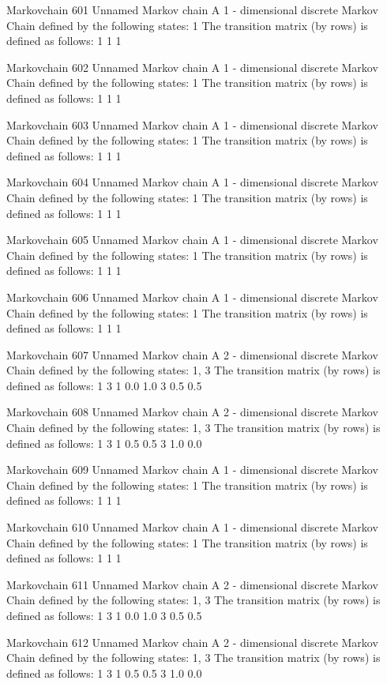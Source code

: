 \documentclass[
  nojss]{jss}
\begin{document}
\begin{CodeChunk}
\begin{CodeOutput}
Markovchain  601 
Unnamed Markov chain 
 A  1 - dimensional discrete Markov Chain defined by the following states: 
 1 
 The transition matrix  (by rows)  is defined as follows: 
  1
1 1

Markovchain  602 
Unnamed Markov chain 
 A  1 - dimensional discrete Markov Chain defined by the following states: 
 1 
 The transition matrix  (by rows)  is defined as follows: 
  1
1 1

Markovchain  603 
Unnamed Markov chain 
 A  1 - dimensional discrete Markov Chain defined by the following states: 
 1 
 The transition matrix  (by rows)  is defined as follows: 
  1
1 1

Markovchain  604 
Unnamed Markov chain 
 A  1 - dimensional discrete Markov Chain defined by the following states: 
 1 
 The transition matrix  (by rows)  is defined as follows: 
  1
1 1

Markovchain  605 
Unnamed Markov chain 
 A  1 - dimensional discrete Markov Chain defined by the following states: 
 1 
 The transition matrix  (by rows)  is defined as follows: 
  1
1 1

Markovchain  606 
Unnamed Markov chain 
 A  1 - dimensional discrete Markov Chain defined by the following states: 
 1 
 The transition matrix  (by rows)  is defined as follows: 
  1
1 1

Markovchain  607 
Unnamed Markov chain 
 A  2 - dimensional discrete Markov Chain defined by the following states: 
 1, 3 
 The transition matrix  (by rows)  is defined as follows: 
    1   3
1 0.0 1.0
3 0.5 0.5

Markovchain  608 
Unnamed Markov chain 
 A  2 - dimensional discrete Markov Chain defined by the following states: 
 1, 3 
 The transition matrix  (by rows)  is defined as follows: 
    1   3
1 0.5 0.5
3 1.0 0.0

Markovchain  609 
Unnamed Markov chain 
 A  1 - dimensional discrete Markov Chain defined by the following states: 
 1 
 The transition matrix  (by rows)  is defined as follows: 
  1
1 1

Markovchain  610 
Unnamed Markov chain 
 A  1 - dimensional discrete Markov Chain defined by the following states: 
 1 
 The transition matrix  (by rows)  is defined as follows: 
  1
1 1

Markovchain  611 
Unnamed Markov chain 
 A  2 - dimensional discrete Markov Chain defined by the following states: 
 1, 3 
 The transition matrix  (by rows)  is defined as follows: 
    1   3
1 0.0 1.0
3 0.5 0.5

Markovchain  612 
Unnamed Markov chain 
 A  2 - dimensional discrete Markov Chain defined by the following states: 
 1, 3 
 The transition matrix  (by rows)  is defined as follows: 
    1   3
1 0.5 0.5
3 1.0 0.0


\end{CodeOutput}
\end{CodeChunk}
\end{document}
